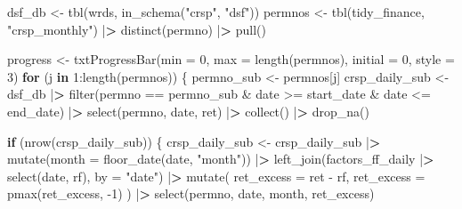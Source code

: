 \documentclass[
]{book}
\newenvironment{Shaded}{\begin{snugshade}}{\end{snugshade}}
\newcommand{\AttributeTok}[1]{\textcolor[rgb]{0.61,0.61,0.61}{#1}}
\newcommand{\ControlFlowTok}[1]{\textcolor[rgb]{0.27,0.27,0.27}{\textbf{#1}}}
\newcommand{\DecValTok}[1]{\textcolor[rgb]{0.06,0.06,0.06}{#1}}
\newcommand{\ErrorTok}[1]{\textcolor[rgb]{0.14,0.14,0.14}{\textbf{#1}}}
\newcommand{\FunctionTok}[1]{\textcolor[rgb]{0,0,0}{#1}}
\newcommand{\NormalTok}[1]{#1}
\newcommand{\OtherTok}[1]{\textcolor[rgb]{0.37,0.37,0.37}{#1}}
\newcommand{\SpecialCharTok}[1]{\textcolor[rgb]{0,0,0}{#1}}
\newcommand{\StringTok}[1]{\textcolor[rgb]{0.5,0.5,0.5}{#1}}
\begin{document}
\begin{Shaded}
\begin{Highlighting}[]
\NormalTok{dsf\_db }\OtherTok{\textless{}{-}} \FunctionTok{tbl}\NormalTok{(wrds, }\FunctionTok{in\_schema}\NormalTok{(}\StringTok{"crsp"}\NormalTok{, }\StringTok{"dsf"}\NormalTok{))}
\NormalTok{permnos }\OtherTok{\textless{}{-}} \FunctionTok{tbl}\NormalTok{(tidy\_finance, }\StringTok{"crsp\_monthly"}\NormalTok{) }\SpecialCharTok{|}\ErrorTok{\textgreater{}}
  \FunctionTok{distinct}\NormalTok{(permno) }\SpecialCharTok{|}\ErrorTok{\textgreater{}}
  \FunctionTok{pull}\NormalTok{()}

\NormalTok{progress }\OtherTok{\textless{}{-}} \FunctionTok{txtProgressBar}\NormalTok{(}\AttributeTok{min =} \DecValTok{0}\NormalTok{, }
                           \AttributeTok{max =} \FunctionTok{length}\NormalTok{(permnos), }
                           \AttributeTok{initial =} \DecValTok{0}\NormalTok{, }
                           \AttributeTok{style =} \DecValTok{3}\NormalTok{)}
\ControlFlowTok{for}\NormalTok{ (j }\ControlFlowTok{in} \DecValTok{1}\SpecialCharTok{:}\FunctionTok{length}\NormalTok{(permnos)) \{}
\NormalTok{  permno\_sub }\OtherTok{\textless{}{-}}\NormalTok{ permnos[j]}
\NormalTok{  crsp\_daily\_sub }\OtherTok{\textless{}{-}}\NormalTok{ dsf\_db }\SpecialCharTok{|}\ErrorTok{\textgreater{}}
    \FunctionTok{filter}\NormalTok{(permno }\SpecialCharTok{==}\NormalTok{ permno\_sub }\SpecialCharTok{\&}
\NormalTok{      date }\SpecialCharTok{\textgreater{}=}\NormalTok{ start\_date }\SpecialCharTok{\&}\NormalTok{ date }\SpecialCharTok{\textless{}=}\NormalTok{ end\_date) }\SpecialCharTok{|}\ErrorTok{\textgreater{}}
    \FunctionTok{select}\NormalTok{(permno, date, ret) }\SpecialCharTok{|}\ErrorTok{\textgreater{}}
    \FunctionTok{collect}\NormalTok{() }\SpecialCharTok{|}\ErrorTok{\textgreater{}}
    \FunctionTok{drop\_na}\NormalTok{()}

  \ControlFlowTok{if}\NormalTok{ (}\FunctionTok{nrow}\NormalTok{(crsp\_daily\_sub)) \{}
\NormalTok{    crsp\_daily\_sub }\OtherTok{\textless{}{-}}\NormalTok{ crsp\_daily\_sub }\SpecialCharTok{|}\ErrorTok{\textgreater{}}
      \FunctionTok{mutate}\NormalTok{(}\AttributeTok{month =} \FunctionTok{floor\_date}\NormalTok{(date, }\StringTok{"month"}\NormalTok{)) }\SpecialCharTok{|}\ErrorTok{\textgreater{}}
      \FunctionTok{left\_join}\NormalTok{(factors\_ff\_daily }\SpecialCharTok{|}\ErrorTok{\textgreater{}}
        \FunctionTok{select}\NormalTok{(date, rf), }\AttributeTok{by =} \StringTok{"date"}\NormalTok{) }\SpecialCharTok{|}\ErrorTok{\textgreater{}}
      \FunctionTok{mutate}\NormalTok{(}
        \AttributeTok{ret\_excess =}\NormalTok{ ret }\SpecialCharTok{{-}}\NormalTok{ rf,}
        \AttributeTok{ret\_excess =} \FunctionTok{pmax}\NormalTok{(ret\_excess, }\SpecialCharTok{{-}}\DecValTok{1}\NormalTok{)}
\NormalTok{      ) }\SpecialCharTok{|}\ErrorTok{\textgreater{}}
      \FunctionTok{select}\NormalTok{(permno, date, month, ret\_excess)}


\end{Highlighting}
\end{Shaded}
\end{document}
